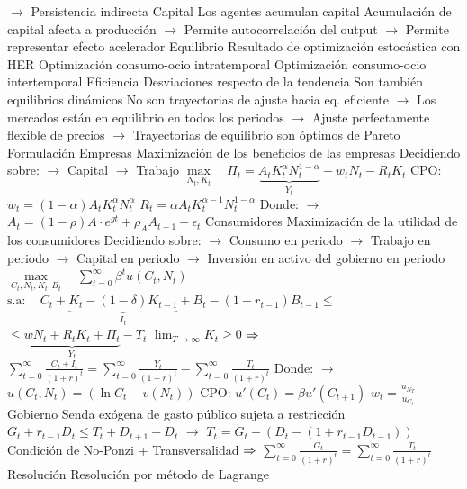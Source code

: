 \documentclass{nuevotema}
\begin{document}
\begin{esquemal}
				\4[] $\to$ Persistencia indirecta
				\4 Capital
				\4[] Los agentes acumulan capital
				\4[] Acumulación de capital afecta a producción
				\4[] $\to$ Permite autocorrelación del output
				\4[] $\to$ Permite representar efecto acelerador
				\4 Equilibrio
				\4[] Resultado de optimización estocástica con HER
				\4[] Optimización consumo-ocio intratemporal
				\4[] Optimización consumo-ocio intertemporal
				\4 Eficiencia
				\4[] Desviaciones respecto de la tendencia
				\4[] Son también equilibrios dinámicos
				\4[] No son trayectorias de ajuste hacia eq. eficiente
				\4[] $\to$ Los mercados están en equilibrio en todos los periodos
				\4[] $\to$ Ajuste perfectamente flexible de precios
				\4[] $\to$ Trayectorias de equilibrio son óptimos de Pareto
		\2 Formulación
			\3 Empresas
				\4 Maximización de los beneficios de las empresas
				\4[] Decidiendo sobre:
				\4[] $\to$ Capital
				\4[] $\to$ Trabajo
				\4[] $\underset{N_t, K_t}{\max} \quad \Pi_t = \underbrace{A_t K_t^\alpha N_t^{1-\alpha}}_{Y_t} - w_t N_t - R_t K_t$
				\4[] CPO: \quad $w_t = (1-\alpha) A_t K_t^\alpha N_t^\alpha$
				\4[] \quad \quad $R_t = \alpha A_t K_t^{\alpha-1} N_t^{1-\alpha}$
				\4[] Donde:
				\4[] $\to$ $A_t = (1-\rho)A\cdot e^{gt} + \rho_A A_{t-1} + \epsilon_t$
			\3 Consumidores
				\4 Maximización de la utilidad de los consumidores
				\4[] Decidiendo sobre:
				\4[] $\to$ Consumo en periodo
				\4[] $\to$ Trabajo en periodo
				\4[] $\to$ Capital en periodo
				\4[] $\to$ Inversión en activo del gobierno en periodo
				\4[] $\underset{C_t, N_t,K_t, B_t}{\max} \quad \sum_{t=0}^\infty \beta^t u(C_t, N_t)$
				\4[] $\text{s.a}: \quad C_t+\underbrace{K_t - (1-\delta)K_{t-1}}_{I_t} + B_t - (1+r_{t-1})B_{t-1} \leq$
				\4[] \quad \quad \quad $\leq \underbrace{wN_t + R_t K_t + \Pi_t}_{Y_t} - T_t$
				\4[] \quad \quad \quad $\lim_{T \to \infty}  K_t \geq 0$
				\4[] \quad \quad \quad $\Rightarrow$ $\sum_{t=0}^\infty \frac{C_t + I_t}{(1+r)^t} = \sum_{t=0}^\infty \frac{ Y_t}{(1+r)^{t}} - \sum_{t=0}^\infty \frac{T_t}{(1+r)^{t}}$
				\4[] Donde:
				\4[] $\to$ $u(C_t, N_t) = \left( \ln C_t  - v(N_t) \right)$
				\4[] CPO: \quad $u'(C_t) = \beta u'(C_{t+1})$
				\4[] \quad \quad $w_t = \frac{u_{N_T}}{u_{C_t}}$
			\3 Gobierno
				\4 Senda exógena de gasto público sujeta a restricción
				\4[] $G_t + r_{t-1} D_t \leq T_t + D_{t+1} - D_t$
				\4[] $\to$ $T_t = G_t - \left( D_t - (1+r_{t-1} D_{t-1}) \right)$
				\4[] Condición de No-Ponzi + Transversalidad
				\4[] $\Rightarrow$ $\sum_{t=0}^\infty \frac{G_t}{(1+r)^t} = \sum_{t=0}^\infty \frac{T_t}{(1+r)^t}$
			\3 Resolución
				\4 Resolución por método de Lagrange

\end{esquemal}
\end{document}
